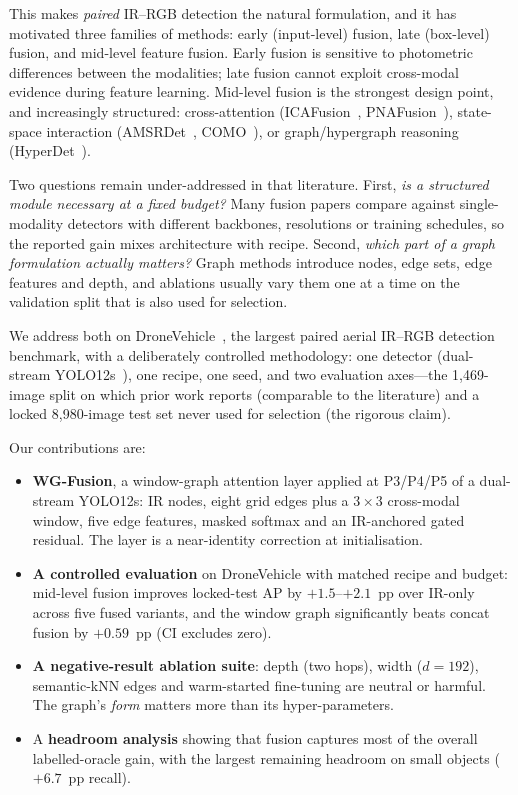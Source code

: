 \documentclass[10pt,twocolumn,letterpaper]{article}
\begin{document}
This makes \emph{paired} IR--RGB detection the natural formulation, and it has
motivated three families of methods: early (input-level) fusion, late
(box-level) fusion, and mid-level feature fusion. Early fusion is sensitive to
photometric differences between the modalities; late fusion cannot exploit
cross-modal evidence during feature learning. Mid-level fusion is the
strongest design point, and increasingly structured: cross-attention
(ICAFusion~\cite{icafusion}, PNAFusion~\cite{pnafusion}), state-space
interaction (AMSRDet~\cite{amsrdet}, COMO~\cite{como}), or graph/hypergraph
reasoning (HyperDet~\cite{hyperdet}).

Two questions remain under-addressed in that literature. First, \emph{is a
structured module necessary at a fixed budget?} Many fusion papers compare
against single-modality detectors with different backbones, resolutions or
training schedules, so the reported gain mixes architecture with recipe.
Second, \emph{which part of a graph formulation actually matters?} Graph
methods introduce nodes, edge sets, edge features and depth, and ablations
usually vary them one at a time on the validation split that is also used for
selection.

We address both on DroneVehicle~\cite{dronevehicle}, the largest paired
aerial IR--RGB detection benchmark, with a deliberately controlled
methodology: one detector (dual-stream YOLO12s~\cite{yolo12}), one recipe, one
seed, and two evaluation axes---the 1,469-image split on which prior work
reports (comparable to the literature) and a locked 8,980-image test set never
used for selection (the rigorous claim).

Our contributions are:
\begin{itemize}
  \item \textbf{WG-Fusion}, a window-graph attention layer applied at P3/P4/P5
        of a dual-stream YOLO12s: IR nodes, eight grid edges plus a $3\times3$
        cross-modal window, five edge features, masked softmax and an
        IR-anchored gated residual. The layer is a near-identity correction at
        initialisation.
  \item \textbf{A controlled evaluation} on DroneVehicle with matched recipe
        and budget: mid-level fusion improves locked-test AP by
        $+1.5$--$+2.1$~pp over IR-only across five fused variants, and the
        window graph significantly beats concat fusion by $+0.59$~pp
        (CI excludes zero).
  \item \textbf{A negative-result ablation suite}: depth (two hops), width
        ($d{=}192$), semantic-kNN edges and warm-started fine-tuning are
        neutral or harmful. The graph's \emph{form} matters more than its
        hyper-parameters.
  \item A \textbf{headroom analysis} showing that fusion captures most of the
        overall labelled-oracle gain, with the largest remaining headroom on
        small objects ($+6.7$~pp recall).
\end{itemize}
\end{document}

